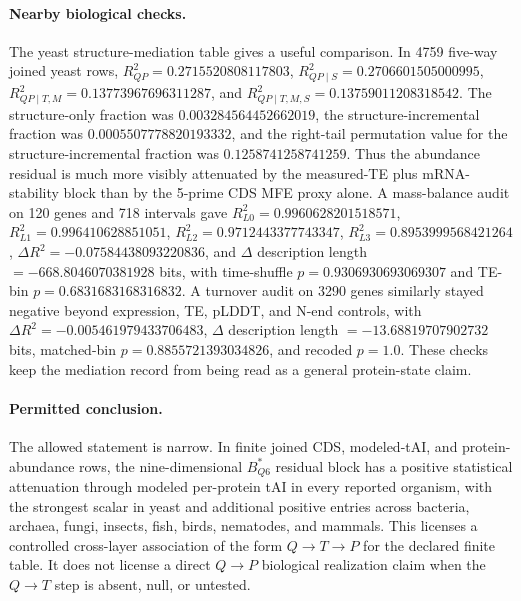 \paragraph{Nearby biological checks.}
The yeast structure-mediation table gives a useful comparison.  In 4759 five-way joined yeast rows, $R^2_{QP}=0.2715520808117803$, $R^2_{QP\mid S}=0.2706601505000995$, $R^2_{QP\mid T,M}=0.13773967696311287$, and $R^2_{QP\mid T,M,S}=0.13759011208318542$.  The structure-only fraction was $0.003284564452662019$, the structure-incremental fraction was $0.0005507778820193332$, and the right-tail permutation value for the structure-incremental fraction was $0.1258741258741259$.  Thus the abundance residual is much more visibly attenuated by the measured-TE plus mRNA-stability block than by the 5-prime CDS MFE proxy alone.  A mass-balance audit on 120 genes and 718 intervals gave $R^2_{L0}=0.9960628201518571$, $R^2_{L1}=0.996410628851051$, $R^2_{L2}=0.9712443377743347$, $R^2_{L3}=0.8953999568421264$, $\Delta R^2=-0.07584438093220836$, and $\Delta$ description length $=-668.8046070381928$ bits, with time-shuffle $p=0.9306930693069307$ and TE-bin $p=0.6831683168316832$.  A turnover audit on 3290 genes similarly stayed negative beyond expression, TE, pLDDT, and N-end controls, with $\Delta R^2=-0.005461979433706483$, $\Delta$ description length $=-13.68819707902732$ bits, matched-bin $p=0.8855721393034826$, and recoded $p=1.0$.  These checks keep the mediation record from being read as a general protein-state claim.

\paragraph{Permitted conclusion.}
The allowed statement is narrow.  In finite joined CDS, modeled-tAI, and protein-abundance rows, the nine-dimensional $B^{\ast}_{Q6}$ residual block has a positive statistical attenuation through modeled per-protein tAI in every reported organism, with the strongest scalar in yeast and additional positive entries across bacteria, archaea, fungi, insects, fish, birds, nematodes, and mammals.  This licenses a controlled cross-layer association of the form $Q\to T\to P$ for the declared finite table.  It does not license a direct $Q\to P$ biological realization claim when the $Q\to T$ step is absent, null, or untested.

